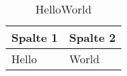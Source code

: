 \begin{table}[H]
	\centering
\begin{tabular}{|l|l|}
	\hline
	\textbf{Spalte 1} & \textbf{Spalte 2} \\ \hline
	Hello             & World             \\ \hline
\end{tabular}
	\caption{HelloWorld}\label{table:HelloWorld}
\end{table}